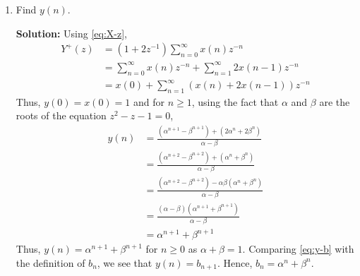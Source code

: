 \documentclass[journal,12pt,twocolumn]{IEEEtran}
\newcommand{\solution}{\noindent \textbf{Solution: }}
\providecommand{\brak}[1]{\ensuremath{\left(#1\right)}}
\providecommand{\sbrak}[1]{\ensuremath{\left[#1\right]}}
\numberwithin{equation}{section}
\renewcommand\thesection{\arabic{section}}
\begin{document}
\begin{enumerate}[label=\thesection.\arabic*,ref=\thesection.\theenumi]
\solution Taking the one-sided $Z$-transform on both sides of \eqref{eq:10-orig-diff-rev},
\begin{align}
&\mathcal{Z}^+\sbrak{y(n)} = \mathcal{Z}^+\sbrak{x(n + 1)} + \mathcal{Z}^+\sbrak{x(n - 1)} \\
&Y^+(z) = zX^+(z) - zx(0) + z^{-1}X^+(z) + zx(-1) \\
&= \frac{z + z^{-1}}{1 - z^{-1} - z^{-2}} - z \\
&= \frac{1 + 2z^{-1}}{1 - z^{-1} - z^{-2}}, \quad |z| > \alpha
\end{align}
since $x(n) = 0\ \forall\ n < 0$.
\item Find $y(n)$.
    \label{pr:1-3}

\solution Using \eqref{eq:X-z},
\begin{align}
    Y^+(z) &= (1 + 2z^{-1})\sum_{n = 0}^{\infty}x(n)z^{-n} \\
           &= \sum_{n = 0}^{\infty}x(n)z^{-n} + \sum_{n = 1}^{\infty}2x(n - 1)z^{-n} \\
           &= x(0) + \sum_{n = 1}^{\infty}\brak{x(n) + 2x(n - 1)}z^{-n}
\end{align}
Thus, $y(0) = x(0) = 1$ and for $n \ge 1$, using the fact that $\alpha$ and 
$\beta$ are the roots of the equation $z^2 - z - 1 = 0$,
\begin{align}
    y(n) &= \frac{\brak{\alpha^{n + 1} - \beta^{n + 1}} + \brak{2\alpha^n + 2\beta^n}}{\alpha - \beta} \\
         &= \frac{\brak{\alpha^{n + 2} - \beta^{n + 2}} + \brak{\alpha^{n} + \beta^{n}}}{\alpha - \beta} \label{eq:y-b} \\
         &= \frac{\brak{\alpha^{n + 2} - \beta^{n + 2}} - \alpha\beta\brak{\alpha^{n} + \beta^{n}}}{\alpha - \beta} \\
         &= \frac{\brak{\alpha - \beta}\brak{\alpha^{n + 1} + \beta^{n + 1}}}{\alpha - \beta} \\
         &= \alpha^{n + 1} + \beta^{n + 1}
\end{align}
Thus, $y(n) = \alpha^{n + 1} + \beta^{n + 1}$ for $n \geq 0$ as $\alpha + \beta = 1$.
Comparing \eqref{eq:y-b} with the definition of $b_n$, we see that $y(n) = b_{n + 1}$.
Hence, $b_n = \alpha^n + \beta^n$.
\end{enumerate}
\end{document}
